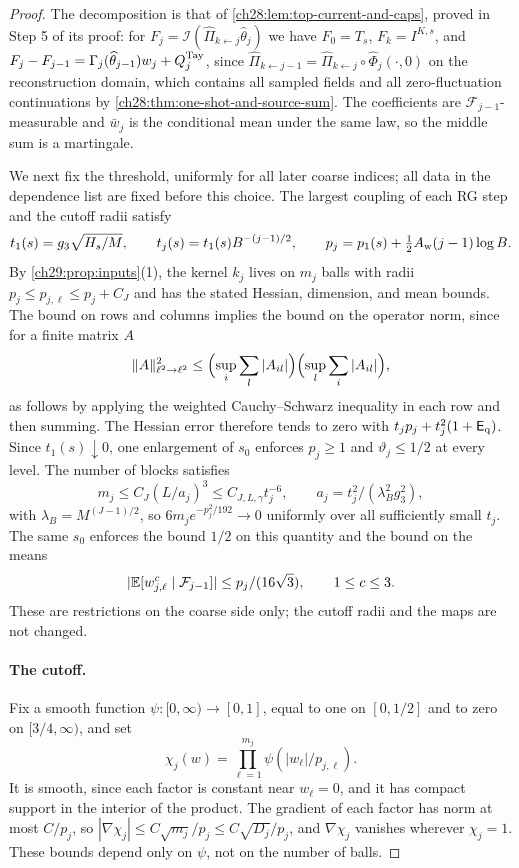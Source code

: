 \begin{proof}
The decomposition is that of \cref{ch28:lem:top-current-and-caps}, proved in Step 5 of its proof: for $F_j=\mathcal I(\widehat\Pi_{k\leftarrow j}\widehat\theta_j)$ we have $F_0=T_s$, $F_k=I^{K,s}$, and $F_j-F_{j-1}=\Gamma_j(\widehat\theta_{j-1})w_j+Q_j^{\rm Tay}$, since $\widehat\Pi_{k\leftarrow j-1}=\widehat\Pi_{k\leftarrow j}\circ\widehat\Phi_j(\cdot,0)$ on the reconstruction domain, which contains all sampled fields and all zero-fluctuation continuations by \cref{ch28:thm:one-shot-and-source-sum}. The coefficients are $\mathcal F_{j-1}$-measurable and $\bar w_j$ is the conditional mean under the same law, so the middle sum is a martingale.

We next fix the threshold, uniformly for all later coarse indices; all data in the dependence list are fixed before this choice. The largest coupling of each RG step and the cutoff radii satisfy
\begin{equation}\label{ch29:eq:couplings-and-radii}
 t_1(s)=g_3\sqrt{H_s/M},\qquad t_j(s)=t_1(s)B^{-(j-1)/2},\qquad p_j=p_1(s)+\tfrac12A_{\rm w}(j-1)\log B.
\end{equation}
By \cref{ch29:prop:inputs}(1), the kernel $k_j$ lives on $m_j$ balls with radii $p_j\le p_{j,\ell}\le p_j+C_J$ and has the stated Hessian, dimension, and mean bounds. The bound on rows and columns implies the bound on the operator norm, since for a finite matrix $A$
\[
 \|A\|_{\ell^2\to\ell^2}^2\le\Bigl(\sup_i\sum_l|A_{il}|\Bigr)\Bigl(\sup_l\sum_i|A_{il}|\Bigr),
\]
as follows by applying the weighted Cauchy--Schwarz inequality in each row and then summing. The Hessian error therefore tends to zero with $t_jp_j+t_j^2(1+\mathsf E_{\rm q})$. Since $t_1(s)\downarrow0$, one enlargement of $s_0$ enforces $p_j\ge1$ and $\vartheta_j\le1/2$ at every level. The number of blocks satisfies
\[
 m_j\le C_J(L/a_j)^3\le C_{J,L,\gamma}t_j^{-6},\qquad a_j=t_j^2/(\lambda_B^2g_3^2),
\]
with $\lambda_B=M^{(J-1)/2}$, so $6m_je^{-p_j^2/192}\to0$ uniformly over all sufficiently small $t_j$. The same $s_0$ enforces the bound $1/2$ on this quantity and the bound on the means
\begin{equation}\label{ch29:eq:mean-slack}
 |\mathbb E[w_{j,\ell}^c\mid\mathcal F_{j-1}]|\le p_j/(16\sqrt3),\qquad1\le c\le3.
\end{equation}
These are restrictions on the coarse side only; the cutoff radii and the maps are not changed.

\paragraph{The cutoff.}
Fix a smooth function $\psi:[0,\infty)\to[0,1]$, equal to one on $[0,1/2]$ and to zero on $[3/4,\infty)$, and set
\[
 \chi_j(w)=\prod_{\ell=1}^{m_j}\psi(|w_\ell|/p_{j,\ell}).
\]
It is smooth, since each factor is constant near $w_\ell=0$, and it has compact support in the interior of the product. The gradient of each factor has norm at most $C/p_j$, so $|\nabla\chi_j|\le C\sqrt{m_j}/p_j\le C\sqrt{D_j}/p_j$, and $\nabla\chi_j$ vanishes wherever $\chi_j=1$. These bounds depend only on $\psi$, not on the number of balls.


\end{proof}
